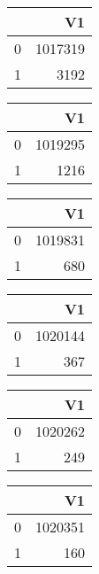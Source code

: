 \bigskip\bigskip
\centering
\begin{tabular}{rr}
  \hline
 & V1 \\ 
  \hline
0 & 1017319 \\ 
  1 & 3192 \\ 
   \hline
\end{tabular}

\bigskip\bigskip
\centering
\begin{tabular}{rr}
  \hline
 & V1 \\ 
  \hline
0 & 1019295 \\ 
  1 & 1216 \\ 
   \hline
\end{tabular}

\bigskip\bigskip
\centering
\begin{tabular}{rr}
  \hline
 & V1 \\ 
  \hline
0 & 1019831 \\ 
  1 & 680 \\ 
   \hline
\end{tabular}

\bigskip\bigskip
\centering
\begin{tabular}{rr}
  \hline
 & V1 \\ 
  \hline
0 & 1020144 \\ 
  1 & 367 \\ 
   \hline
\end{tabular}

\bigskip\bigskip
\centering
\begin{tabular}{rr}
  \hline
 & V1 \\ 
  \hline
0 & 1020262 \\ 
  1 & 249 \\ 
   \hline
\end{tabular}

\bigskip\bigskip
\centering
\begin{tabular}{rr}
  \hline
 & V1 \\ 
  \hline
0 & 1020351 \\ 
  1 & 160 \\ 
   \hline
\end{tabular}

